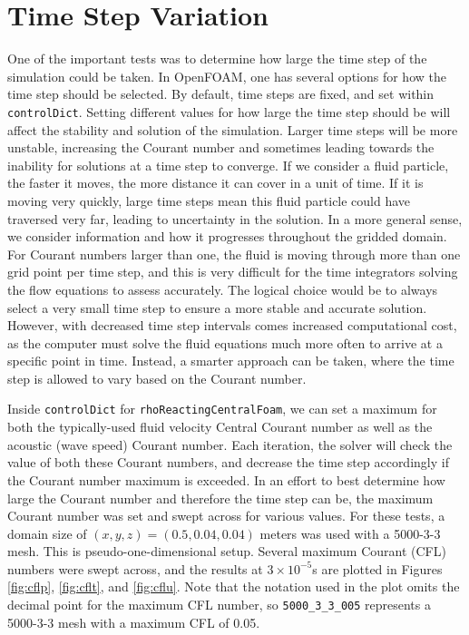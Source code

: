 \section{Time Step Variation}
One of the important tests was to determine how large the time step of the simulation could be taken. In OpenFOAM, one has several options for how the time step should be selected. By default, time steps are fixed, and set within \verb|controlDict|. Setting different values for how large the time step should be will affect the stability and solution of the simulation. Larger time steps will be more unstable, increasing the Courant number and sometimes leading towards the inability for solutions at a time step to converge. If we consider a fluid particle, the faster it moves, the more distance it can cover in a unit of time. If it is moving very quickly, large time steps mean this fluid particle could have traversed very far, leading to uncertainty in the solution. In a more general sense, we consider information and how it progresses throughout the gridded domain. For Courant numbers larger than one, the fluid is moving through more than one grid point per time step, and this is very difficult for the time integrators solving the flow equations to assess accurately. The logical choice would be to always select a very small time step to ensure a more stable and accurate solution. However, with decreased time step intervals comes increased computational cost, as the computer must solve the fluid equations much more often to arrive at a specific point in time. Instead, a smarter approach can be taken, where the time step is allowed to vary based on the Courant number. 

Inside \verb|controlDict| for \verb|rhoReactingCentralFoam|, we can set a maximum for both the typically-used fluid velocity Central Courant number as well as the acoustic (wave speed) Courant number. Each iteration, the solver will check the value of both these Courant numbers, and decrease the time step accordingly if the Courant number maximum is exceeded. In an effort to best determine how large the Courant number and therefore the time step can be, the maximum Courant number was set and swept across for various values. For these tests, a domain size of \( (x,y,z) = (0.5,0.04,0.04) \) meters was used with a 5000-3-3 mesh. This is pseudo-one-dimensional setup. Several maximum Courant (CFL) \cite{courant} numbers were swept across, and the results at \(3\times 10^{ - 5}\)s are plotted in Figures \ref{fig:cflp}, \ref{fig:cflt}, and \ref{fig:cflu}. Note that the notation used in the plot omits the decimal point for the maximum CFL number, so \verb|5000_3_3_005| represents a 5000-3-3 mesh with a maximum CFL of 0.05. 

